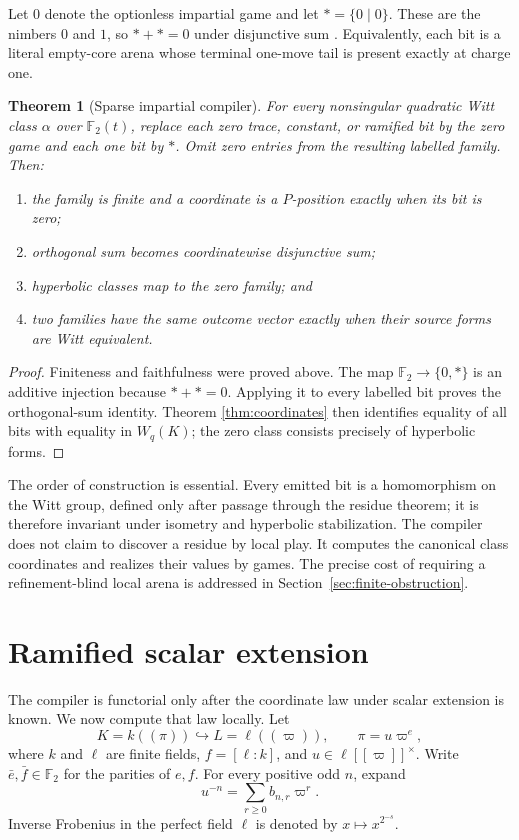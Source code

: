 \documentclass[11pt]{article}
\newtheorem{theorem}{Theorem}[section]
\theoremstyle{definition}
\theoremstyle{remark}
\newcommand{\F}{\mathbb{F}}
\begin{document}
Let $0$ denote the optionless impartial game and let $*=\{0\mid0\}$.  These
are the nimbers $0$ and $1$, so $*+*=0$ under disjunctive sum
\cite{conway1976}.  Equivalently, each bit is a literal empty-core arena whose
terminal one-move tail is present exactly at charge one.

\begin{theorem}[Sparse impartial compiler]\label{thm:compiler}
For every nonsingular quadratic Witt class $\alpha$ over $\F_2(t)$, replace
each zero trace, constant, or ramified bit by the zero game and each one bit by
$*$.  Omit zero entries from the resulting labelled family.  Then:
\begin{enumerate}
\item the family is finite and a coordinate is a $P$-position exactly when its
bit is zero;
\item orthogonal sum becomes coordinatewise disjunctive sum;
\item hyperbolic classes map to the zero family; and
\item two families have the same outcome vector exactly when their source
forms are Witt equivalent.
\end{enumerate}
\end{theorem}

\begin{proof}
Finiteness and faithfulness were proved above.  The map
$\F_2\to\{0,*\}$ is an additive injection because $*+*=0$.  Applying it to
every labelled bit proves the orthogonal-sum identity.  Theorem
\ref{thm:coordinates} then identifies equality of all bits with equality in
$W_q(K)$; the zero class consists precisely of hyperbolic forms.
\end{proof}

The order of construction is essential.  Every emitted bit is a homomorphism
on the Witt group, defined only after passage through the residue theorem; it
is therefore invariant under isometry and hyperbolic stabilization.  The
compiler does not claim to discover a residue by local play.  It computes the
canonical class coordinates and realizes their values by games.  The precise
cost of requiring a refinement-blind local arena is addressed in
Section~\ref{sec:finite-obstruction}.

\section{Ramified scalar extension}\label{sec:ramification}

The compiler is functorial only after the coordinate law under scalar
extension is known.  We now compute that law locally.  Let
\[
K=k((\pi))\hookrightarrow L=\ell((\varpi)),
\qquad \pi=u\varpi^e,
\]
where $k$ and $\ell$ are finite fields, $f=[\ell:k]$, and
$u\in\ell[[\varpi]]^\times$.  Write $\bar e,\bar f\in\F_2$ for the parities of
$e,f$.  For every positive odd $n$, expand
\[
u^{-n}=\sum_{r\ge0}b_{n,r}\varpi^r.
\]
Inverse Frobenius in the perfect field $\ell$ is denoted by $x\mapsto
x^{2^{-s}}$.
\end{document}
